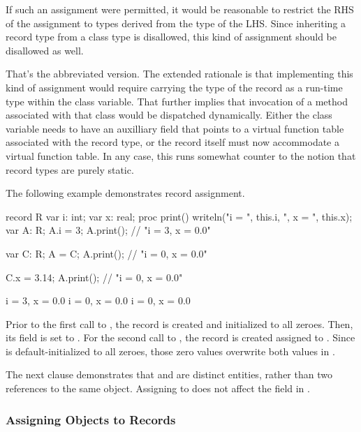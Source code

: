 \begin{rationale}
If such an assignment were permitted, it would be reasonable to restrict the RHS
of the assignment to types derived from the type of the LHS.  Since inheriting a
record type from a class type is disallowed, this kind of assignment should be
disallowed as well.

That's the abbreviated version.  The extended rationale is that implementing
this kind of assignment would require carrying the type of the record as a
run-time type within the class variable.  That further implies that invocation
of a method associated with that class would be dispatched dynamically.  Either
the class variable needs to have an auxilliary field that points to a virtual
function table associated with the record type, or the record itself must now
accommodate a virtual function table.  In any case, this runs somewhat counter
to the notion that record types are purely static.
\end{rationale}

The following example demonstrates record assignment.
\begin{example}
\begin{chapelpre}
\end{chapelpre}
\begin{chapel}
record R {
  var i: int;
  var x: real;
  proc print() { writeln("i = ", this.i, ", x = ", this.x); }
}
var A: R;
A.i = 3;
A.print();	// "i = 3, x = 0.0"

var C: R;
A = C;
A.print();	// "i = 0, x = 0.0"

C.x = 3.14;
A.print();	// "i = 0, x = 0.0"
\end{chapel}
\begin{chapeloutput}
i = 3, x = 0.0
i = 0, x = 0.0
i = 0, x = 0.0
\end{chapeloutput}
Prior to the first call to , the record  is created and
initialized to all zeroes.  Then, its  field is set to .
For the second call to , the record  is created assigned
to .  Since  is default-initialized to all zeroes, those zero
values overwrite both values in .

The next clause demonstrates that  and  are distinct entities,
rather than two references to the same object.  Assigning 
to  does not affect the  field in .
\end{example}

\subsubsection{Assigning Objects to Records}
\label{Assigning_Objects_to_Records}

